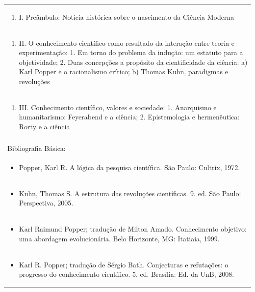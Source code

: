 \documentclass[11pt]{article}
\begin{document}
\begin{center}
\begin{longtable}{|p{4cm}|p{4cm}|p{4cm}|p{4cm}|}
\multicolumn{4}{|p{\dimexpr 16cm + 6\tabcolsep\relax}|}{\begin{enumerate}[start=1]\item I. Preâmbulo: Notícia histórica sobre o nascimento da Ciência Moderna\end{enumerate}}\\
\multicolumn{4}{|p{\dimexpr 16cm + 6\tabcolsep\relax}|}{\begin{enumerate}[start=2]\item II. O conhecimento científico como resultado da interação entre teoria e experimentação: 1. Em torno do problema da indução: um estatuto para a objetividade; 2. Duas concepções a propósito da cientificidade da ciência: a) Karl Popper e o racionalismo crítico; b) Thomas Kuhn, paradigmas e revoluções\end{enumerate}}\\
\multicolumn{4}{|p{\dimexpr 16cm + 6\tabcolsep\relax}|}{\begin{enumerate}[start=3]\item III. Conhecimento científico, valores e sociedade: 1. Anarquismo e humanitarismo: Feyerabend e a ciência; 2. Epistemologia e hermenêutica: Rorty e a ciência\end{enumerate}}\\
\multicolumn{4}{|p{\dimexpr 16cm + 6\tabcolsep\relax}|}{}\\
\hline
\multicolumn{4}{|p{16cm}|}{Bibliografia Básica:}\\*
\multicolumn{4}{|p{\dimexpr 16cm + 6\tabcolsep\relax}|}{\begin{itemize}\item Popper, Karl R. A lógica da pesquisa científica. São Paulo: Cultrix, 1972.\end{itemize}}\\
\multicolumn{4}{|p{\dimexpr 16cm + 6\tabcolsep\relax}|}{\begin{itemize}\item Kuhn, Thomas S. A estrutura das revoluções científicas. 9. ed. São Paulo: Perspectiva, 2005.\end{itemize}}\\
\multicolumn{4}{|p{\dimexpr 16cm + 6\tabcolsep\relax}|}{\begin{itemize}\item Karl Raimund Popper; tradução de Milton Amado. Conhecimento objetivo: uma abordagem evolucionária. Belo Horizonte, MG: Itatiaia, 1999.\end{itemize}}\\
\multicolumn{4}{|p{\dimexpr 16cm + 6\tabcolsep\relax}|}{\begin{itemize}\item Karl R. Popper; tradução de Sérgio Bath. Conjecturas e refutações: o progresso do conhecimento científico. 5. ed. Brasília: Ed. da UnB, 2008.\end{itemize}}\\

\end{longtable}
\end{center}
\end{document}
